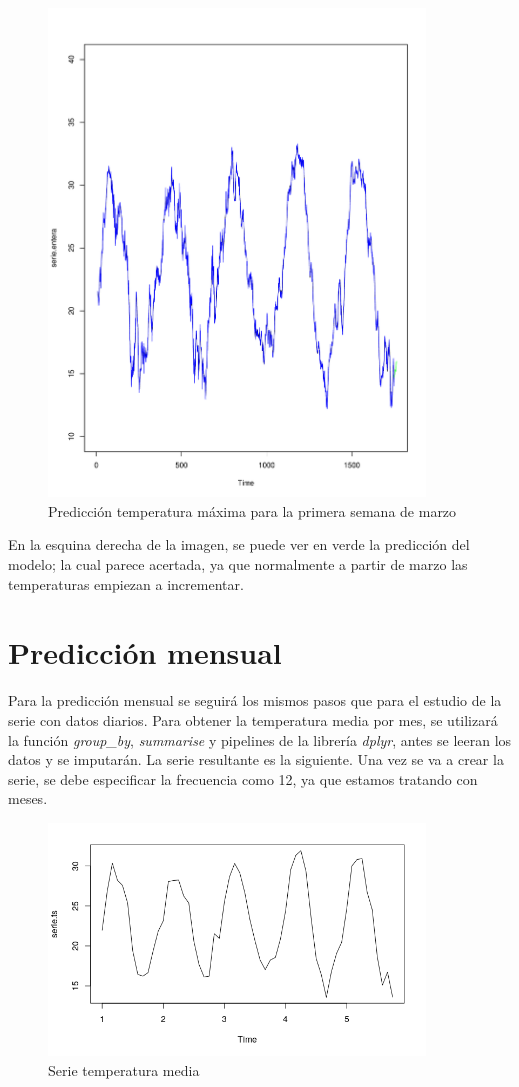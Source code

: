 \begin{figure}[H]
	\centering
	\includegraphics[width=100mm]{imagenes/pred_ar1.pdf}
	\caption{Predicción temperatura máxima para la primera semana de marzo}
	\label{fig:15}
\end{figure}

En la esquina derecha de la imagen, se puede ver en verde la predicción del modelo; la cual parece acertada, ya que normalmente a partir de marzo las temperaturas empiezan a incrementar.
 
\section{Predicción mensual}
Para la predicción mensual se seguirá los mismos pasos que para el estudio de la serie con datos diarios. Para obtener la temperatura media por mes, se utilizará la función \textit{group\_by}, \textit{summarise} y pipelines de la librería \textit{dplyr}, antes se leeran los datos y se imputarán. La serie resultante es la siguiente. Una vez se va a crear la serie, se debe especificar la frecuencia como 12, ya que estamos tratando con meses.

\begin{figure}[H]
	\centering
	\includegraphics[width=100mm]{imagenes/serie_mean.png}
	\caption{Serie temperatura media}
	\label{fig:16}
\end{figure}

